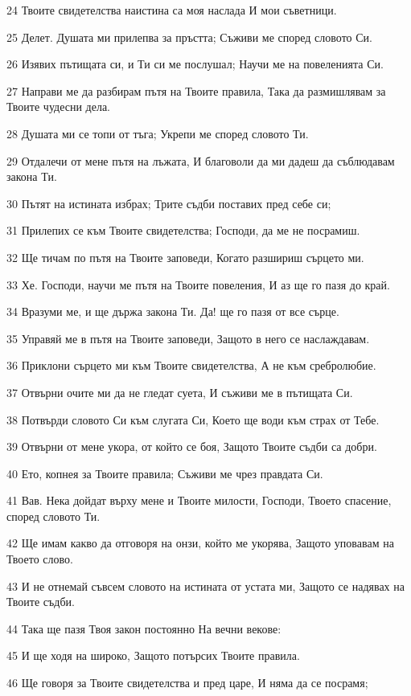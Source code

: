 \par 24 Твоите свидетелства наистина са моя наслада И мои съветници.
\par 25 Делет. Душата ми прилепва за пръстта; Съживи ме според словото Си.
\par 26 Изявих пътищата си, и Ти си ме послушал; Научи ме на повеленията Си.
\par 27 Направи ме да разбирам пътя на Твоите правила, Така да размишлявам за Твоите чудесни дела.
\par 28 Душата ми се топи от тъга; Укрепи ме според словото Ти.
\par 29 Отдалечи от мене пътя на лъжата, И благоволи да ми дадеш да съблюдавам закона Ти.
\par 30 Пътят на истината избрах; Трите съдби поставих пред себе си;
\par 31 Прилепих се към Твоите свидетелства; Господи, да ме не посрамиш.
\par 32 Ще тичам по пътя на Твоите заповеди, Когато разшириш сърцето ми.
\par 33 Хе. Господи, научи ме пътя на Твоите повеления, И аз ще го пазя до край.
\par 34 Вразуми ме, и ще държа закона Ти. Да! ще го пазя от все сърце.
\par 35 Управяй ме в пътя на Твоите заповеди, Защото в него се наслаждавам.
\par 36 Приклони сърцето ми към Твоите свидетелства, А не към сребролюбие.
\par 37 Отвърни очите ми да не гледат суета, И съживи ме в пътищата Си.
\par 38 Потвърди словото Си към слугата Си, Което ще води към страх от Тебе.
\par 39 Отвърни от мене укора, от който се боя, Защото Твоите съдби са добри.
\par 40 Ето, копнея за Твоите правила; Съживи ме чрез правдата Си.
\par 41 Вав. Нека дойдат върху мене и Твоите милости, Господи, Твоето спасение, според словото Ти.
\par 42 Ще имам какво да отговоря на онзи, който ме укорява, Защото уповавам на Твоето слово.
\par 43 И не отнемай съвсем словото на истината от устата ми, Защото се надявах на Твоите съдби.
\par 44 Така ще пазя Твоя закон постоянно На вечни векове:
\par 45 И ще ходя на широко, Защото потърсих Твоите правила.
\par 46 Ще говоря за Твоите свидетелства и пред царе, И няма да се посрамя;
